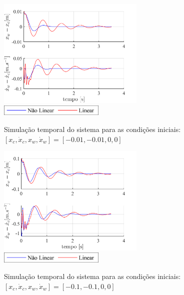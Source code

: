 \documentclass[a4paper]{ifacconf}
\begin{document}
    \FloatBarrier
    \begin{figure}[htbp]
        \begin{centering}
            \includegraphics[width=7cm]{img/sim_temp_xc_n001_dxc_n001.png}
            \includegraphics[width=5cm]{img/sim_temp_Leg.png}
            \caption{Simulação temporal do sistema para as condições iniciais:  $[x_c, \dot{x}_c, x_w, \dot{x}_w]=[-0.01,-0.01,0,0]$}
            \label{fig:sim_temp_xc_n01_dxc_n01}
        \end{centering}
    \end{figure}
    \FloatBarrier
    
    \FloatBarrier
    \begin{figure}[htbp]
        \begin{centering}
            \includegraphics[width=7cm]{img/sim_temp_xc_n01_dxc_n01.png}
            \includegraphics[width=5cm]{img/sim_temp_Leg.png}
            \caption{Simulação temporal do sistema para as condições iniciais:  $[x_c, \dot{x}_c, x_w, \dot{x}_w]=[-0.1,-0.1,0,0]$}
            \label{fig:sim_temp_xc_n01_dxc_n01}
        \end{centering}
    \end{figure}
    \FloatBarrier
    
\end{document}
